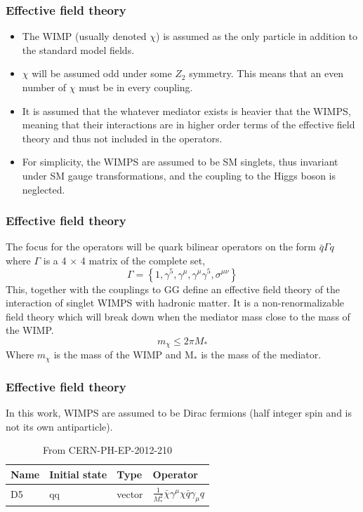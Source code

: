 \documentclass[•]{beamer}
\theoremstyle{remark}
\begin{document}
\begin{frame}\frametitle{Effective field theory}
\begin{itemize}
\item The WIMP (usually denoted $\chi$) is assumed as the only particle in addition to the standard model fields. 
\item $\chi$ will be assumed odd under some $Z_2$ symmetry. This means that an even number of $\chi$ must be in every coupling. 
\item It is assumed that the whatever mediator exists is heavier that the WIMPS, meaning that their interactions are in higher order terms of the effective field theory and thus not included in the operators. 
\item For simplicity, the WIMPS are assumed to be SM singlets, thus invariant under SM gauge transformations, and the coupling to the Higgs boson is neglected.
\end{itemize}
\end{frame}
\begin{frame}[shrink=10]\frametitle{Effective field theory}
\begin{block}

The focus for the operators will be quark bilinear operators on the form $\bar{q}\Gamma q$ where $\Gamma$ is a 4 $\times$ 4 matrix of the complete set, 
\begin{equation*}
\Gamma = \left\lbrace 1,\gamma ^5,\gamma ^\mu,\gamma ^\mu \gamma ^5, \sigma ^{\mu \nu} \right\rbrace
\end{equation*}
This, together with the couplings to GG define an effective field theory of the interaction of singlet WIMPS with hadronic matter. It is a non-renormalizable field theory which will break down when the mediator mass close to the mass of the WIMP.
\begin{equation*}
m_\chi \leqslant 2\pi M_*
\end{equation*}
Where $m_\chi$ is the mass of the WIMP and M$_*$ is the mass of the mediator. 
\end{block}
\end{frame}
\begin{frame}\frametitle{Effective field theory}
In this work, WIMPS are assumed to be Dirac fermions (half integer spin and is not its own antiparticle). 
\renewcommand{\arraystretch}{1.5} %
\begin{table}[H]
\begin{center}
    \begin{tabular}{ | l | l | l | l |}
    \hline
    Name & Initial state & Type & Operator \\ \hline
  	D5 & qq & vector & $\frac{1}{M^2_*} \bar{\chi} \gamma^\mu \chi \bar{q} \gamma_\mu q$ \\ \hline

  	\end{tabular}

  	\caption{From {CERN-PH-EP-2012-210}}
  	\label{tab:operators}
  	  	\end{center}
    \end{table}
\renewcommand{\arraystretch}{1.0}  %
\end{frame}
\end{document}
